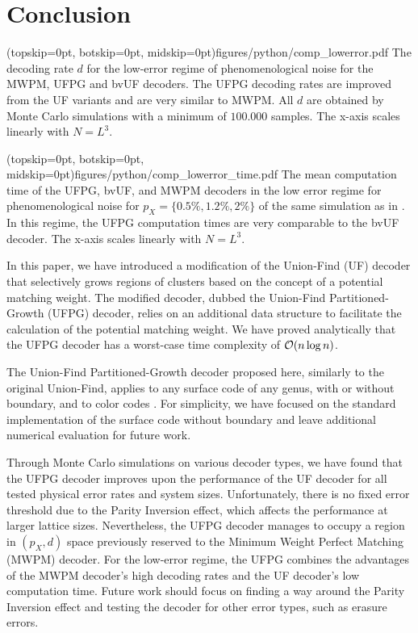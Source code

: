 \section{Conclusion}\label{sec:conclusion}

\Figure[b!](topskip=0pt, botskip=0pt, midskip=0pt){figures/python/comp_lowerror.pdf}{
  The decoding rate $d$ for the low-error regime of phenomenological noise for the MWPM, UFPG and bvUF decoders. The UFPG decoding rates are improved from the UF variants and are very similar to MWPM. All $d$ are obtained by Monte Carlo simulations with a minimum of $100.000$ samples. The x-axis scales linearly with $N = L^3$.\label{comp_lowerror}}

\Figure[b!](topskip=0pt, botskip=0pt, midskip=0pt){figures/python/comp_lowerror_time.pdf}{
  The mean computation time of the UFPG, bvUF, and MWPM decoders in the low error regime for phenomenological noise for $p_X = \{0.5\%, 1.2\%, 2\%\}$ of the same simulation as in . In this regime, the UFPG computation times are very comparable to the bvUF decoder. The x-axis scales linearly with $N = L^3$. \label{comp_lowerror_time}}

In this paper, we have introduced a modification of the Union-Find (UF) decoder \cite{delfosse2017almost} that selectively grows regions of clusters based on the concept of a potential matching weight. The modified decoder, dubbed the Union-Find Partitioned-Growth (UFPG) decoder, relies on an additional data structure to facilitate the calculation of the potential matching weight. We have proved analytically that the UFPG decoder has a worst-case time complexity of $\mathcal{O}(n\log{n})$. 

The Union-Find Partitioned-Growth decoder proposed here, similarly to the original Union-Find, applies to any surface code of any genus, with or without boundary, and to color codes \cite{delfosse2017almost}. For simplicity, we have focused on the standard implementation of the surface code without boundary and leave additional numerical evaluation for future work.

Through Monte Carlo simulations on various decoder types, we have found that the UFPG decoder improves upon the performance of the UF decoder for all tested physical error rates and system sizes. Unfortunately, there is no fixed error threshold due to the Parity Inversion effect, which affects the performance at larger lattice sizes. Nevertheless, the UFPG decoder manages to occupy a region in $(p_X, d)$ space previously reserved to the Minimum Weight Perfect Matching (MWPM) decoder. For the low-error regime, the UFPG combines the advantages of the MWPM decoder's high decoding rates and the UF decoder's low computation time. Future work should focus on finding a way around the Parity Inversion effect and testing the decoder for other error types, such as erasure errors. 

